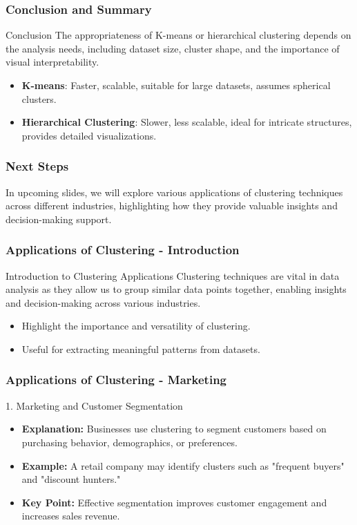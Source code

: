 \documentclass[aspectratio=169]{beamer}
\begin{document}
\begin{frame}[fragile]
    \frametitle{Conclusion and Summary}
    \begin{block}{Conclusion}
        The appropriateness of K-means or hierarchical clustering depends on the analysis needs, including dataset size, cluster shape, and the importance of visual interpretability.
    \end{block}
    \begin{itemize}
        \item \textbf{K-means}: Faster, scalable, suitable for large datasets, assumes spherical clusters.
        \item \textbf{Hierarchical Clustering}: Slower, less scalable, ideal for intricate structures, provides detailed visualizations.
    \end{itemize}
\end{frame}

\begin{frame}[fragile]
    \frametitle{Next Steps}
    In upcoming slides, we will explore various applications of clustering techniques across different industries, highlighting how they provide valuable insights and decision-making support.
\end{frame}

\begin{frame}[fragile]
    \frametitle{Applications of Clustering - Introduction}
    \begin{block}{Introduction to Clustering Applications}
        Clustering techniques are vital in data analysis as they allow us to group similar data points together, enabling insights and decision-making across various industries. 
    \end{block}
    \begin{itemize}
        \item Highlight the importance and versatility of clustering.
        \item Useful for extracting meaningful patterns from datasets.
    \end{itemize}
\end{frame}

\begin{frame}[fragile]
    \frametitle{Applications of Clustering - Marketing}
    \begin{block}{1. Marketing and Customer Segmentation}
        \begin{itemize}
            \item \textbf{Explanation:} Businesses use clustering to segment customers based on purchasing behavior, demographics, or preferences.
            \item \textbf{Example:} A retail company may identify clusters such as "frequent buyers" and "discount hunters."
            \item \textbf{Key Point:} Effective segmentation improves customer engagement and increases sales revenue.
        \end{itemize}
    \end{block}
\end{frame}
\end{document}
